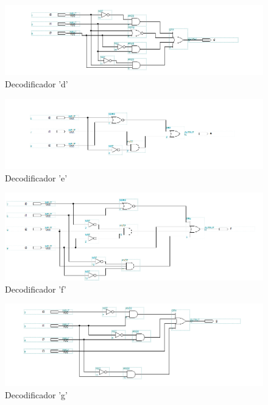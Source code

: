 \documentclass[a4paper]{article}
\begin{document}
\begin{figure}[h!]
  \centering
  \includegraphics[scale=0.7]{dec_d.png}
  \caption{Decodificador 'd'}
\end{figure}

\begin{figure}[h!]
  \centering
  \includegraphics[scale=0.7]{dec_e.png}
  \caption{Decodificador 'e'}
\end{figure}

\begin{figure}[h!]
  \centering
  \includegraphics[scale=0.7]{dec_f.png}
  \caption{Decodificador 'f'}
\end{figure}

\begin{figure}[h!]
  \centering
  \includegraphics[scale=0.7]{dec_g.png}
  \caption{Decodificador 'g'}
\end{figure}
\end{document}

